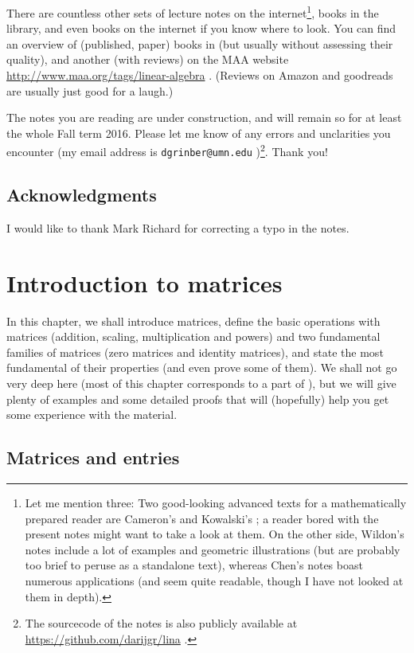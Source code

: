 \documentclass[numbers=enddot,12pt,final,onecolumn,notitlepage]{scrartcl}%
\theoremstyle{definition}
\begin{document}
There are countless other sets of lecture notes on the internet\footnote{Let
me mention three: Two good-looking advanced texts for a mathematically
prepared reader are Cameron's \cite{Camero08} and Kowalski's \cite{Kowals16};
a reader bored with the present notes might want to take a look at them. On
the other side, Wildon's notes \cite{Wildon16} include a lot of examples and
geometric illustrations (but are probably too brief to peruse as a standalone
text), whereas Chen's notes \cite{Chen08} boast numerous applications (and
seem quite readable, though I have not looked at them in depth).}, books in
the library, and even books on the internet if you know where to look. You can
find an overview of (published, paper) books in \cite{Drucker12} (but usually
without assessing their quality), and another (with reviews) on the MAA
website \url{http://www.maa.org/tags/linear-algebra} . (Reviews on Amazon and
goodreads are usually just good for a laugh.)

The notes you are reading are under construction, and will remain so for at
least the whole Fall term 2016. Please let me know of any errors and
unclarities you encounter (my email address is \texttt{dgrinber@umn.edu}%
)\footnote{The sourcecode of the notes is also publicly available at
\url{https://github.com/darijgr/lina} .}. Thank you!

\subsection{Acknowledgments}

I would like to thank Mark Richard for correcting a typo in the notes.

\section{\label{chp.intro}Introduction to matrices}

In this chapter, we shall introduce matrices, define the basic operations with
matrices (addition, scaling, multiplication and powers) and two fundamental
families of matrices (zero matrices and identity matrices), and state the most
fundamental of their properties (and even prove some of them). We shall not go
very deep here (most of this chapter corresponds to a part of \cite[\S A.2]%
{LaNaSc16}), but we will give plenty of examples and some detailed proofs that
will (hopefully) help you get some experience with the material.

\subsection{Matrices and entries}
\end{document}
